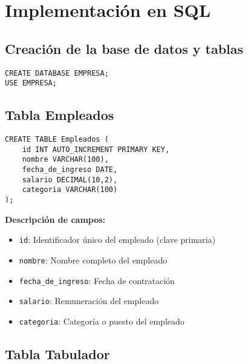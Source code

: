 




\section{Implementación en SQL}

\subsection{Creación de la base de datos y tablas}

\begin{lstlisting}
CREATE DATABASE EMPRESA;
USE EMPRESA;
\end{lstlisting}

\subsection{Tabla Empleados}

\begin{lstlisting}
CREATE TABLE Empleados (
    id INT AUTO_INCREMENT PRIMARY KEY,
    nombre VARCHAR(100),
    fecha_de_ingreso DATE,
    salario DECIMAL(10,2),
    categoria VARCHAR(100)
);
\end{lstlisting}

\textbf{Descripción de campos:}
\begin{itemize}
    \item \texttt{id}: Identificador único del empleado (clave primaria)
    \item \texttt{nombre}: Nombre completo del empleado
    \item \texttt{fecha\_de\_ingreso}: Fecha de contratación
    \item \texttt{salario}: Remuneración del empleado
    \item \texttt{categoria}: Categoría o puesto del empleado
\end{itemize}

\subsection{Tabla Tabulador}

